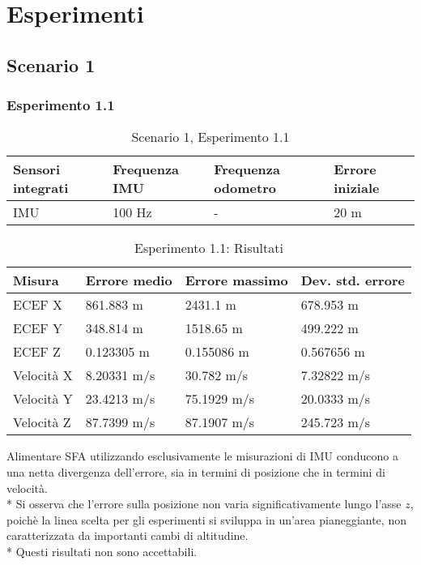 \section{Esperimenti}
\subsection{Scenario 1}
\subsubsection{Esperimento 1.1}
	\begin{table}[h]
	\centering
	\begin{tabular}{|p{2.75cm}|p{2.75cm}|p{2.75cm}|p{2.75cm}|}
		\hline 
		\textbf{Sensori integrati} & \textbf{Frequenza IMU}  & \textbf{Frequenza odometro} & \textbf{Errore iniziale} \\ 
		\hline 
		IMU & 100 Hz & - & 20 m\\ 
		\hline 
	\end{tabular}
	\caption{Scenario 1, Esperimento 1.1}
	\label{tab:exp11}
\end{table}
	\begin{table}[h]
	\centering
	\begin{tabular}{|p{2cm}|p{3cm}|p{3cm}|p{3cm}|}
		\hline 
		\textbf{Misura} & \textbf{Errore medio}  & \textbf{Errore massimo} & \textbf{Dev. std. errore}\\ 
		\hline 
		ECEF X & 861.883 m & 2431.1 m & 678.953 m \\ 
		\hline 
		ECEF Y & 348.814 m & 1518.65 m & 499.222 m \\ 
		\hline 
		ECEF Z & 0.123305 m & 0.155086 m & 0.567656 m \\ 
		\hline 
		Velocit\`a X & 8.20331 m/s & 30.782 m/s & 7.32822 m/s \\ 
		\hline 
		Velocit\`a Y & 23.4213 m/s & 75.1929 m/s & 20.0333 m/s \\ 
		\hline 
		Velocit\`a Z & 87.7399 m/s & 87.1907 m/s & 245.723 m/s \\ 
		\hline 
	\end{tabular}
	\caption{Esperimento 1.1: Risultati}
	\label{tab:exp11res}
\end{table}
Alimentare SFA utilizzando esclusivamente le misurazioni di IMU conducono a una netta divergenza dell'errore, sia in termini di posizione che in termini di velocit\`a.\\*
Si osserva che l'errore sulla posizione non varia significativamente lungo l'asse $z$, poich\`e la linea scelta per gli esperimenti si sviluppa in un'area pianeggiante, non caratterizzata da importanti cambi di altitudine.\\*
Questi risultati non sono accettabili.
